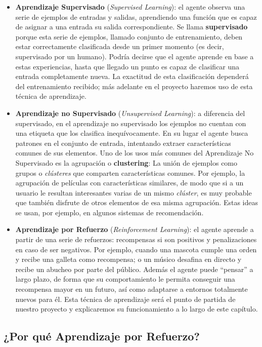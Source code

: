 \begin{itemize}
    \item \textbf{Aprendizaje Supervisado} (\textit{Supervised Learning}): el agente observa una serie de ejemplos de entradas y salidas, aprendiendo una función que es capaz de asignar a una entrada su salida correspondiente. Se llama \textbf{supervisado} porque esta serie de ejemplos, llamado conjunto de entrenamiento, deben estar correctamente clasificada desde un primer momento (es decir, supervisado por un humano). Podría decirse que el agente aprende en base a estas experiencias, hasta que llegado un punto es capaz de clasificar una entrada completamente nueva. La exactitud de esta clasificación dependerá del entrenamiento recibido; más adelante en el proyecto haremos uso de esta técnica de aprendizaje.
    \item \textbf{Aprendizaje no Supervisado} (\textit{Unsupervised Learning}): a diferencia del supervisado, en el aprendizaje no supervisado los ejemplos no cuentan con una etiqueta que los clasifica inequívocamente. En su lugar el agente busca patrones en el conjunto de entrada, intentando extraer características comunes de sus elementos. Uno de los usos más comunes del Aprendizaje No Supervisado es la agrupación o \textbf{clustering}: La unión de ejemplos como grupos o \textit{clústeres} que comparten características comunes. Por ejemplo, la agrupación de películas con características similares, de modo que si a un usuario le resultan interesantes varias de un mismo \textit{clúster}, es muy probable que también disfrute de otros elementos de esa misma agrupación. Estas ideas se usan, por ejemplo, en algunos sistemas de recomendación.   
    \item \textbf{Aprendizaje por Refuerzo} (\textit{Reinforcement Learning}): el agente aprende a partir de una serie de refuerzos: recompensas si son positivos y penalizaciones en caso de ser negativos. Por ejemplo, cuando una mascota cumple una orden y recibe una galleta como recompensa; o un músico desafina en directo y recibe un abucheo por parte del público. Además el agente puede ``pensar'' a largo plazo, de forma que su comportamiento le permita conseguir una recompensa mayor en un futuro, así como adaptarse a entornos totalmente nuevos para él. Esta técnica de aprendizaje será el punto de partida de nuestro proyecto y explicaremos su funcionamiento a lo largo de este capítulo. 
\end{itemize}


\subsection{¿Por qué Aprendizaje por Refuerzo?}


